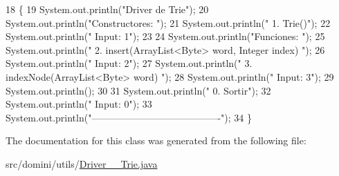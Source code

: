 \begin{DoxyCode}
18                                      \{
19         System.out.println(\textcolor{stringliteral}{"Driver de Trie"});
20         System.out.println(\textcolor{stringliteral}{"Constructores: "});
21         System.out.println(\textcolor{stringliteral}{"     1. Trie()"});
22         System.out.println(\textcolor{stringliteral}{"     Input: 1"});
23 
24         System.out.println(\textcolor{stringliteral}{"Funciones: "});
25         System.out.println(\textcolor{stringliteral}{"     2. insert(ArrayList<Byte> word, Integer index) "});
26         System.out.println(\textcolor{stringliteral}{"     Input: 2"});
27         System.out.println(\textcolor{stringliteral}{"     3. indexNode(ArrayList<Byte> word) "});
28         System.out.println(\textcolor{stringliteral}{"     Input: 3"});
29         System.out.println();
30 
31         System.out.println(\textcolor{stringliteral}{"     0. Sortir"});
32         System.out.println(\textcolor{stringliteral}{"     Input: 0"});
33         System.out.println(\textcolor{stringliteral}{"----------------------------------------"});
34     \}
\end{DoxyCode}


The documentation for this class was generated from the following file\+:\begin{DoxyCompactItemize}
\item 
src/domini/utils/\hyperlink{Driver____Trie_8java}{Driver\+\_\+\+\_\+\+Trie.\+java}\end{DoxyCompactItemize}
